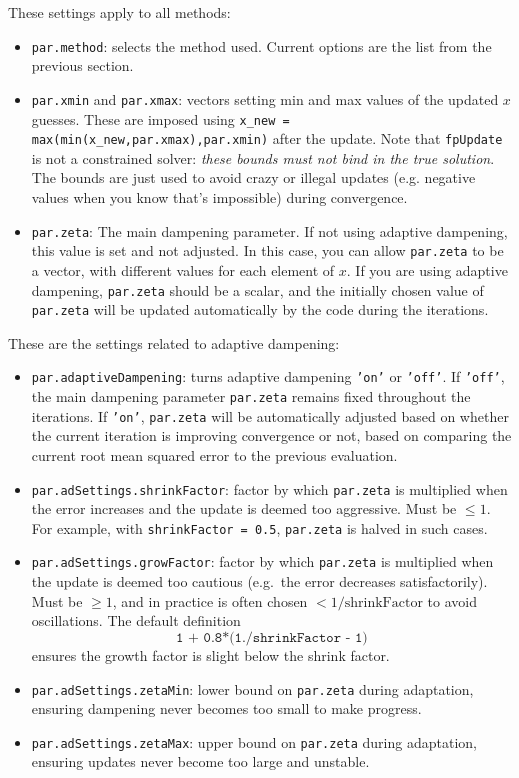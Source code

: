 \documentclass[a4paper,12pt]{article}
\newcommand{\code}[1]{\texttt{#1}}
\begin{document}
These settings apply to all methods:
\begin{itemize}
\item \code{par.method}: selects the method used. Current options are the list from the previous section. 
\item \code{par.xmin} and \code{par.xmax}: vectors setting min and max values of the updated $x$ guesses. These are imposed using \code{x\_new = max(min(x\_new,par.xmax),par.xmin)} after the update. Note that \code{fpUpdate} is not a constrained solver: \emph{these bounds must not bind in the true solution}. The bounds are just used to avoid crazy or illegal updates (e.g. negative values when you know that's impossible) during convergence. 
\item \code{par.zeta}: The main dampening parameter. If not using adaptive dampening, this value is set and not adjusted. In this case, you can allow \code{par.zeta} to be a vector, with different values for each element of $x$. If you are using adaptive dampening, \code{par.zeta} should be a scalar, and the initially chosen value of \code{par.zeta} will be updated automatically by the code during the iterations. 
\end{itemize}
These are the settings related to adaptive dampening:
\begin{itemize}
\item \code{par.adaptiveDampening}: turns adaptive dampening \code{'on'} or \code{'off'}. If \code{'off'}, the main dampening parameter \code{par.zeta} remains fixed throughout the iterations. If \code{'on'}, \code{par.zeta} will be automatically adjusted based on whether the current iteration is improving convergence or not, based on comparing the current root mean squared error to the previous evaluation. 
\item \code{par.adSettings.shrinkFactor}: factor by which \code{par.zeta} is multiplied when the error increases and the update is deemed too aggressive. Must be $\leq 1$. For example, with \code{shrinkFactor = 0.5}, \code{par.zeta} is halved in such cases.
\item \code{par.adSettings.growFactor}: factor by which \code{par.zeta} is multiplied when the update is deemed too cautious (e.g.\ the error decreases satisfactorily). Must be $\geq 1$, and in practice is often chosen $< 1/\text{shrinkFactor}$ to avoid oscillations. The default definition  
\[
\code{1 + 0.8*(1./shrinkFactor - 1)}
\]
ensures the growth factor is slight below the shrink factor. 
\item \code{par.adSettings.zetaMin}: lower bound on \code{par.zeta} during adaptation, ensuring dampening never becomes too small to make progress.  
\item \code{par.adSettings.zetaMax}: upper bound on \code{par.zeta} during adaptation, ensuring updates never become too large and unstable.
\end{itemize}
\end{document}
